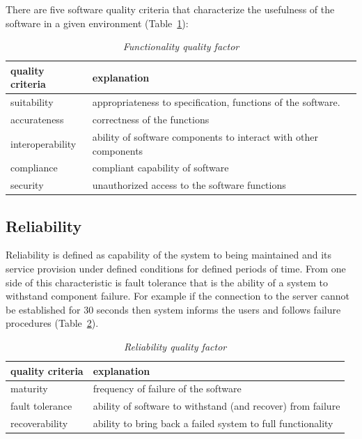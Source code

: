 There are five software quality criteria that characterize the usefulness of the software in a given environment (Table~\ref{tab:functionality_factor}):

\begin{table}[h!]
	\centering
\begin{tabular}{|l|l|}
\hline
{\bf quality criteria} & {\bf explanation} \\
\hline
suitability & appropriateness to specification, functions of the software. \\
\hline
accurateness & correctness of the functions \\
\hline
interoperability & ability of software components to interact with other components \\
\hline
compliance & compliant capability of software  \\
\hline
  security & unauthorized access to the software functions \\
\hline
\end{tabular}	
	\caption{\textit{Functionality quality factor}}
	\label{tab:functionality_factor}
\end{table}


\subsection{Reliability}
Reliability is defined as capability of the system to being maintained and its service provision under defined conditions for defined periods of time. From one side of this characteristic is fault tolerance that is the ability of a system to withstand component failure. For example if the connection to the server cannot be established for 30 seconds then system informs the users and follows failure procedures (Table~\ref{tab:reliability_factor}). 

\begin{table}[h!]
	\centering
\begin{tabular}{|l|l|}
\hline
{\bf quality criteria} & {\bf explanation} \\
\hline
  maturity & frequency of failure of the software \\
\hline
fault tolerance & ability of software to withstand (and recover) from failure \\
\hline
recoverability & ability to bring back a failed system to full functionality \\
\hline
\end{tabular}	
	\caption{\textit{Reliability quality factor}}
	\label{tab:reliability_factor}
\end{table}


